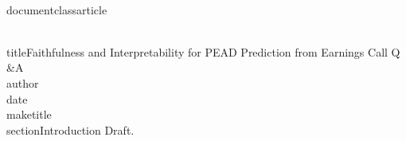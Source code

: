 \\documentclass{article}
\begin{document}
\\title{Faithfulness and Interpretability for PEAD Prediction from Earnings Call Q\\&A}
\\author{}
\\date{}
\\maketitle
\\section{Introduction}
Draft.
\
\end{document}
